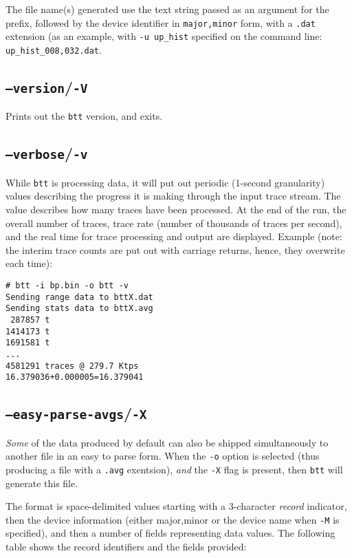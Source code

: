 \documentclass{article}
\begin{document}
  \medskip
  The file name(s) generated use the text string passed as an argument for
  the prefix, followed by the device identifier in \texttt{major,minor}
  form, with a \texttt{.dat} extension (as an example, with \texttt{-u
  up\_hist} specified on the command line: \texttt{up\_hist\_008,032.dat}.

\subsection{\label{sec:o-V}\texttt{--version}/\texttt{-V}}

  Prints out the \texttt{btt} version, and exits.

\subsection{\label{sec:o-v}\texttt{--verbose}/\texttt{-v}}

  While \texttt{btt} is processing data, it will put out periodic (1-second
  granularity) values describing the progress it is making through the
  input trace stream. The value describes how many traces have been
  processed. At the end of the run, the overall number of traces, trace
  rate (number of thousands of traces per second), and the real time for
  trace processing and output are displayed. Example (note: the interim
  trace counts are put out with carriage returns, hence, they overwrite
  each time):

\begin{verbatim}
# btt -i bp.bin -o btt -v
Sending range data to bttX.dat
Sending stats data to bttX.avg
 287857 t
1414173 t
1691581 t
...
4581291 traces @ 279.7 Ktps
16.379036+0.000005=16.379041
\end{verbatim}

\subsection{\label{sec:o-X}\texttt{--easy-parse-avgs}/\texttt{-X}}

  \emph{Some} of the data produced by default can also be shipped
  simultaneously to another file in an easy to parse form. When
  the \texttt{-o} option is selected (thus producing a file with a
  \texttt{.avg} exentsion), \emph{and} the \texttt{-X} flag is present,
  then \texttt{btt} will generate this file.

  The format is space-delimited values starting with a 3-character
  \emph{record} indicator, then the device information (either major,minor
  or the device name when \texttt{-M} is specified), and then a number of
  fields representing data values. The following table shows the record
  identifiers and the fields provided:
\end{document}
